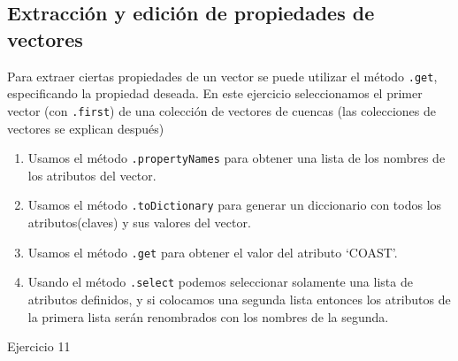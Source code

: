 \documentclass[
  12pt,
  letterpaper,
  twoside]{book}
\providecommand{\tightlist}{%
  \setlength{\itemsep}{0pt}\setlength{\parskip}{0pt}}
\begin{document}
\hypertarget{extracciuxf3n-y-ediciuxf3n-de-propiedades-de-vectores}{%
\subsection{Extracción y edición de propiedades de vectores}\label{extracciuxf3n-y-ediciuxf3n-de-propiedades-de-vectores}}

Para extraer ciertas propiedades de un vector se puede utilizar el método \texttt{.get}, especificando la propiedad deseada. En este ejercicio seleccionamos el primer vector (con \texttt{.first}) de una colección de vectores de cuencas (las colecciones de vectores se explican después)

\begin{enumerate}
\def\labelenumi{\arabic{enumi}.}
\tightlist
\item
  Usamos el método \texttt{.propertyNames} para obtener una lista de los nombres de los atributos del vector.
\item
  Usamos el método \texttt{.toDictionary} para generar un diccionario con todos los atributos(claves) y sus valores del vector.
\item
  Usamos el método \texttt{.get} para obtener el valor del atributo `COAST'.
\item
  Usando el método \texttt{.select} podemos seleccionar solamente una lista de atributos definidos, y si colocamos una segunda lista entonces los atributos de la primera lista serán renombrados con los nombres de la segunda.
\end{enumerate}

Ejercicio 11
\end{document}
